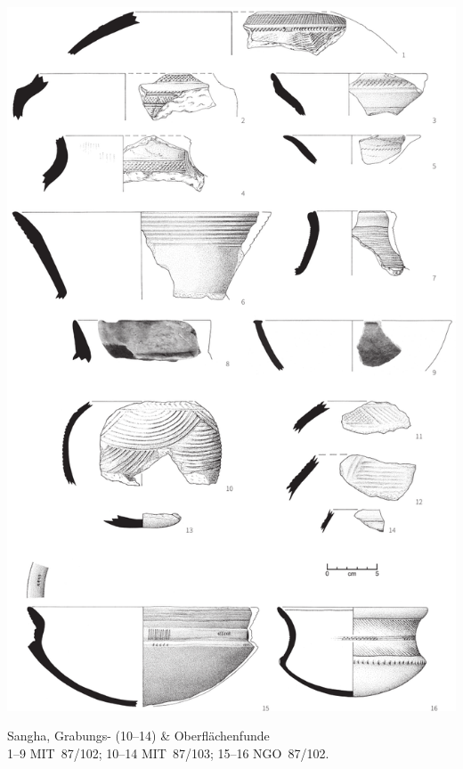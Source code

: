 \begin{pl}[H]
	\includegraphics{plt/Taf42.pdf}
	\vspace{.75em}\caption{\mbox{Sangha}, Grabungs- (10--14) \& Oberflächenfunde \\ 1--9 MIT~87/102; 10--14 MIT~87/103; 15--16 NGO~87/102.}
	\label{pl:42}
\end{pl}

